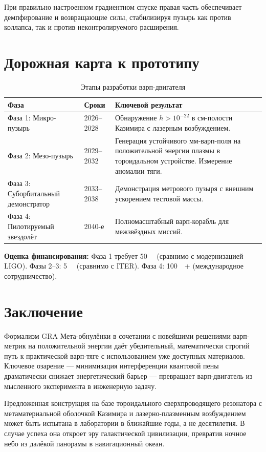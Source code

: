 \documentclass[11pt]{article}
\begin{document}
При правильно настроенном градиентном спуске правая часть обеспечивает демпфирование и возвращающие силы, стабилизируя пузырь как против коллапса, так и против неконтролируемого расширения.

\section{Дорожная карта к прототипу}

\begin{table}[h]
\centering
\caption{Этапы разработки варп-двигателя}
\label{tab:roadmap}
\begin{tabular}{@{}lll@{}}
\toprule
\textbf{Фаза} & \textbf{Сроки} & \textbf{Ключевой результат} \\
\midrule
Фаза 1: Микро-пузырь & 2026--2028 & Обнаружение $h > 10^{-22}$ в см-полости Казимира с лазерным возбуждением. \\
Фаза 2: Мезо-пузырь & 2029--2032 & Генерация устойчивого мм-варп-поля на положительной энергии плазмы в тороидальном устройстве. Измерение аномалии тяги. \\
Фаза 3: Суборбитальный демонстратор & 2033--2038 & Демонстрация метрового пузыря с внешним ускорением тестовой массы. \\
Фаза 4: Пилотируемый звездолёт & 2040-е & Полномасштабный варп-корабль для межзвёздных миссий. \\
\bottomrule
\end{tabular}
\end{table}

\textbf{Оценка финансирования:} Фаза 1 требует \SI{50}{\mega\USD} (сравнимо с модернизацией LIGO). Фазы 2--3: \SI{5}{\giga\USD} (сравнимо с ITER). Фаза 4: \SI{100}{\giga\USD}+ (международное сотрудничество).

\section{Заключение}

Формализм GRA Мета-обнулёнки в сочетании с новейшими решениями варп-метрик на положительной энергии даёт убедительный, математически строгий путь к практической варп-тяге с использованием уже доступных материалов. Ключевое озарение — минимизация интерференции квантовой пены драматически снижает энергетический барьер — превращает варп-двигатель из мысленного эксперимента в инженерную задачу.

Предложенная конструкция на базе тороидального сверхпроводящего резонатора с метаматериальной оболочкой Казимира и лазерно-плазменным возбуждением может быть испытана в лаборатории в ближайшие годы, а не десятилетия. В случае успеха она откроет эру галактической цивилизации, превратив ночное небо из далёкой панорамы в навигационный океан.
\end{document}
